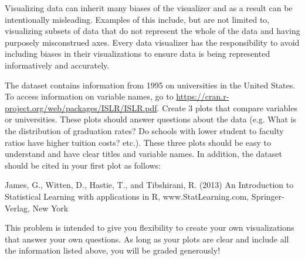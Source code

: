 \begin{warn}
Visualizing data can inherit many biases of the visualizer and as a result can be intentionally misleading.
Examples of this include, but are not limited to, visualizing subsets of data that do not represent the whole of the data and having purposely misconstrued axes.
Every data visualizer has the responsibility to avoid including biases in their visualizations to ensure data is being represented informatively and accurately.
\end{warn}
\begin{problem}
The dataset  contains information from 1995 on universities in the United States.
To access information on variable names, go to \url{https://cran.r-project.org/web/packages/ISLR/ISLR.pdf}.
Create 3 plots that compare variables or universities.
These plots should answer questions about the data (e.g. What is the distribution of graduation rates? Do schools with lower student to faculty ratios have higher tuition costs? etc.).
These three plots should be easy to understand and have clear titles and variable names.
In addition, the dataset should be cited in your first plot as follows:

James, G., Witten, D., Hastie, T., and Tibshirani, R. (2013) An Introduction to Statistical Learning with applications in R, www.StatLearning.com, Springer-Verlag, New York

This problem is intended to give you flexibility to create your own visualizations that answer your own questions.
As long as your plots are clear and include all the information listed above, you will be graded generously!
\end{problem}




